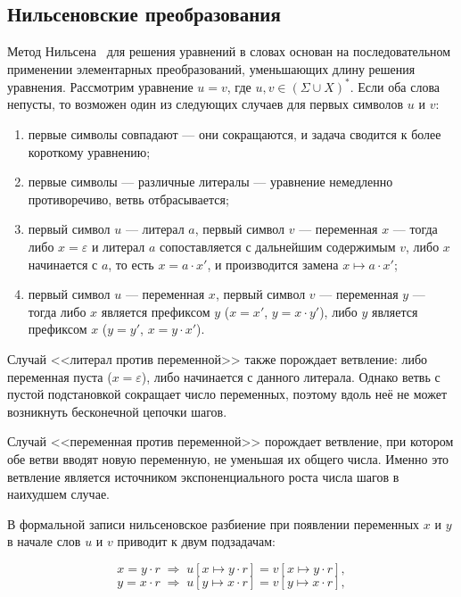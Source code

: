 \documentclass[14pt, russian]{scrartcl}
\begin{document}
\subsection{Нильсеновские преобразования}

Метод Нильсена~\cite{nielsen1917} для решения уравнений в словах основан на последовательном
применении элементарных преобразований, уменьшающих длину решения уравнения. Рассмотрим уравнение
$u = v$, где $u, v \in (\Sigma \cup X)^*$. Если оба слова непусты, то возможен один из
следующих случаев для первых символов $u$ и $v$:

\begin{enumerate}
\item первые символы совпадают --- они сокращаются, и задача сводится к более короткому уравнению;
\item первые символы --- различные литералы --- уравнение немедленно противоречиво, ветвь отбрасывается;
\item первый символ $u$ --- литерал $a$, первый символ $v$ --- переменная $x$ --- тогда
  либо $x = \varepsilon$ и литерал $a$ сопоставляется с дальнейшим содержимым $v$,
  либо $x$ начинается с $a$, то есть $x = a \cdot x'$, и производится замена $x \mapsto a \cdot x'$;
\item первый символ $u$ --- переменная $x$, первый символ $v$ --- переменная $y$ --- тогда
  либо $x$ является префиксом $y$ ($x = x'$, $y = x \cdot y'$), либо $y$ является
  префиксом $x$ ($y = y'$, $x = y \cdot x'$).
\end{enumerate}

Случай <<литерал против переменной>> также порождает ветвление: либо переменная
пуста ($x = \varepsilon$), либо начинается с данного литерала. Однако ветвь с пустой
подстановкой сокращает число переменных, поэтому вдоль неё не может возникнуть
бесконечной цепочки шагов.

Случай <<переменная против переменной>> порождает ветвление, при котором обе ветви
вводят новую переменную, не уменьшая их общего числа. Именно это ветвление является
источником экспоненциального роста числа шагов в наихудшем случае.

В формальной записи нильсеновское разбиение при появлении переменных $x$ и $y$ в
начале слов $u$ и $v$ приводит к двум подзадачам:

\begin{equation}
x = y \cdot r \;\Rightarrow\; u[x \mapsto y \cdot r] = v[x \mapsto y \cdot r],
\end{equation}
\begin{equation}
y = x \cdot r \;\Rightarrow\; u[y \mapsto x \cdot r] = v[y \mapsto x \cdot r],
\end{equation}
\end{document}
